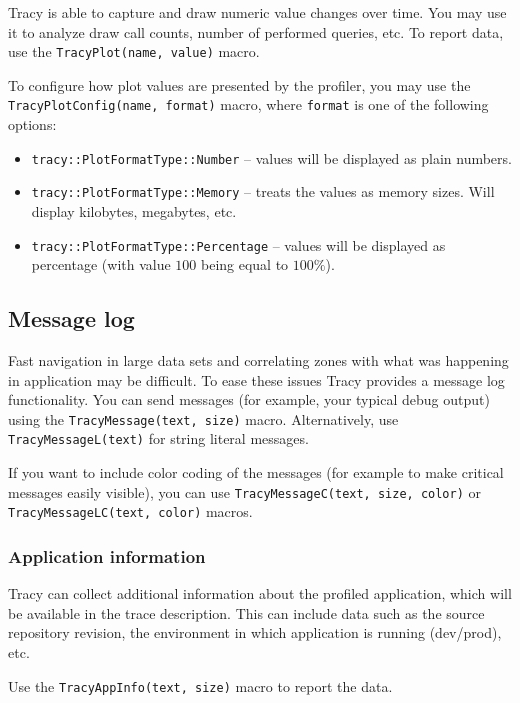 \documentclass[hidelinks,titlepage,a4paper]{article}
\begin{document}
Tracy is able to capture and draw numeric value changes over time. You may use it to analyze draw call counts, number of performed queries, etc. To report data, use the \texttt{TracyPlot(name, value)} macro.

To configure how plot values are presented by the profiler, you may use the \texttt{TracyPlotConfig(name, format)} macro, where \texttt{format} is one of the following options:

\begin{itemize}
\item \texttt{tracy::PlotFormatType::Number} -- values will be displayed as plain numbers.
\item \texttt{tracy::PlotFormatType::Memory} -- treats the values as memory sizes. Will display kilobytes, megabytes, etc.
\item \texttt{tracy::PlotFormatType::Percentage} -- values will be displayed as percentage (with value $100$ being equal to $100\%$).
\end{itemize}

\subsection{Message log}
\label{messagelog}

Fast navigation in large data sets and correlating zones with what was happening in application may be difficult. To ease these issues Tracy provides a message log functionality. You can send messages (for example, your typical debug output) using the \texttt{TracyMessage(text, size)} macro. Alternatively, use \texttt{TracyMessageL(text)} for string literal messages.

If you want to include color coding of the messages (for example to make critical messages easily visible), you can use \texttt{TracyMessageC(text, size, color)} or \texttt{TracyMessageLC(text, color)} macros.

\subsubsection{Application information}
\label{appinfo}

Tracy can collect additional information about the profiled application, which will be available in the trace description. This can include data such as the source repository revision, the environment in which application is running (dev/prod), etc.

Use the \texttt{TracyAppInfo(text, size)} macro to report the data.
\end{document}
